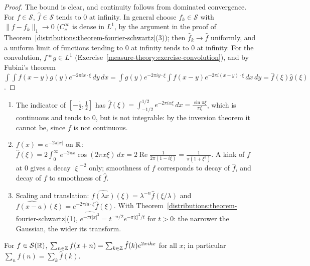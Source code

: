 \begin{proof}
The bound is clear, and continuity follows from dominated convergence. For $f \in \mathcal{S}$, $\hat f \in \mathcal{S}$ tends to $0$ at infinity. In general choose $f_k \in \mathcal{S}$ with $\|f - f_k\|_1 \to 0$
($C_c^\infty$ is dense in $L^1$, by the argument in the proof of Theorem~\ref{distributions:theorem-fourier-schwartz}(3)); then $\hat f_k \to \hat f$ uniformly, and a uniform limit of functions tending to
$0$ at infinity tends to $0$ at infinity. For the convolution, $f * g \in L^1$ (Exercise~\ref{measure-theory:exercise-convolution}), and by Fubini's theorem
$\int\int f(x - y)g(y)e^{-2\pi ix\cdot\xi}\,dy\,dx = \int g(y)e^{-2\pi iy\cdot\xi}\int f(x - y)e^{-2\pi i(x - y)\cdot\xi}\,dx\,dy = \hat f(\xi)\hat g(\xi)$.
\end{proof}

\begin{example}\label{distributions:example-fourier-computations}
\begin{enumerate}
\item The indicator of $[-\frac12, \frac12]$ has $\hat f(\xi) = \int_{-1/2}^{1/2}e^{-2\pi ix\xi}\,dx = \frac{\sin\pi\xi}{\pi\xi}$, which is continuous and tends to $0$, but is not integrable: by the inversion theorem it
cannot be, since $f$ is not continuous.
\item $f(x) = e^{-2\pi|x|}$ on $\mathbb{R}$: $\hat f(\xi) = 2\int_0^\infty e^{-2\pi x}\cos(2\pi x\xi)\,dx = 2\operatorname{Re}\frac{1}{2\pi(1 - i\xi)} = \frac{1}{\pi(1 + \xi^2)}$. A kink of $f$ at $0$ gives a decay
$|\xi|^{-2}$ only; smoothness of $f$ corresponds to decay of $\hat f$, and decay of $f$ to smoothness of $\hat f$.
\item Scaling and translation: $\widehat{f(\lambda x)}(\xi) = \lambda^{-n}\hat f(\xi/\lambda)$ and $\widehat{f(x - a)}(\xi) = e^{-2\pi ia\cdot\xi}\hat f(\xi)$. With
Theorem~\ref{distributions:theorem-fourier-schwartz}(1), $\widehat{e^{-\pi t|x|^2}} = t^{-n/2}e^{-\pi|\xi|^2/t}$ for $t > 0$: the narrower the Gaussian, the wider its transform.
\end{enumerate}
\end{example}

\begin{proposition}\label{distributions:proposition-poisson}
For $f \in \mathcal{S}(\mathbb{R})$, $\sum_{n \in \mathbb{Z}}f(x + n) = \sum_{k \in \mathbb{Z}}\hat f(k)e^{2\pi ikx}$ for all $x$; in particular $\sum_nf(n) = \sum_k\hat f(k)$.
\end{proposition}

